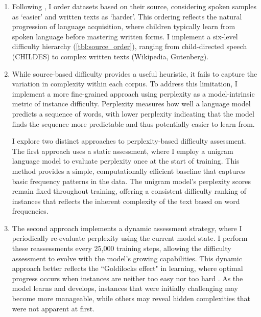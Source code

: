 \begin{enumerate}

\item {} Following \citet{huebner2021babyberta}, I order datasets based on their source, considering spoken samples as `easier' and written texts as `harder'. This ordering reflects the natural progression of language acquisition, where children typically learn from spoken language before mastering written forms. I implement a six-level difficulty hierarchy (\cref{tbl:source_order}), ranging from child-directed speech (CHILDES) to complex written texts (Wikipedia, Gutenberg).

\item {} While source-based difficulty provides a useful heuristic, it fails to capture the variation in complexity within each corpus. To address this limitation, I implement a more fine-grained approach using perplexity as a model-intrinsic metric of instance difficulty. Perplexity measures how well a language model predicts a sequence of words, with lower perplexity indicating that the model finds the sequence more predictable and thus potentially easier to learn from. 

 I explore two distinct approaches to perplexity-based difficulty assessment. The first approach uses a static assessment, where I employ a unigram language model to evaluate perplexity once at the start of training. This method provides a simple, computationally efficient baseline that captures basic frequency patterns in the data. The unigram model's perplexity scores remain fixed throughout training, offering a consistent difficulty ranking of instances that reflects the inherent complexity of the text based on word frequencies.

\item {} The second approach implements a dynamic assessment strategy, where I periodically re-evaluate perplexity using the current model state. I perform these reassessments every 25,000 training steps, allowing the difficulty assessment to evolve with the model's growing capabilities. This dynamic approach better reflects the ``Goldilocks effect" in learning, where optimal progress occurs when instances are neither too easy nor too hard \citep{kidd2012goldilocks}. As the model learns and develops, instances that were initially challenging may become more manageable, while others may reveal hidden complexities that were not apparent at first.


\end{enumerate}
